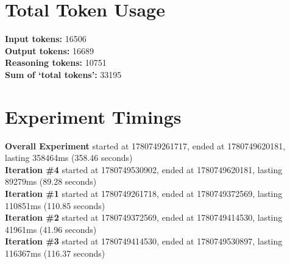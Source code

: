 \documentclass{article}
\begin{document}
\section*{Total Token Usage}
\textbf{Input tokens: }16506
\\\textbf{Output tokens: }16689
\\\textbf{Reasoning tokens: }10751
\\\textbf{Sum of `total tokens': }33195
\section*{Experiment Timings}
\textbf{Overall Experiment} started at 1780749261717, ended at 1780749620181, lasting 358464ms (358.46 seconds)
\\\textbf{Iteration \#4} started at 1780749530902, ended at 1780749620181, lasting 89279ms (89.28 seconds)
\\\textbf{Iteration \#1} started at 1780749261718, ended at 1780749372569, lasting 110851ms (110.85 seconds)
\\\textbf{Iteration \#2} started at 1780749372569, ended at 1780749414530, lasting 41961ms (41.96 seconds)
\\\textbf{Iteration \#3} started at 1780749414530, ended at 1780749530897, lasting 116367ms (116.37 seconds)
\end{document}
